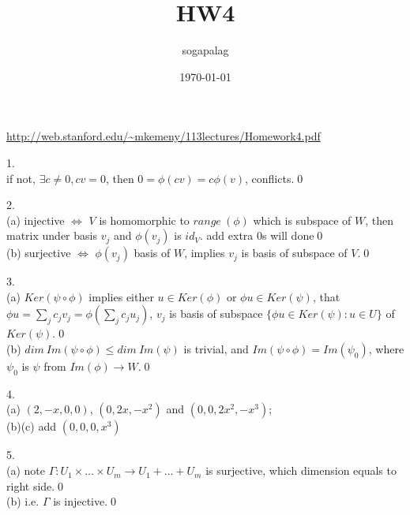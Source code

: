 \documentclass[paper=a4, fontsize=11pt]{scrartcl} %
\title{HW4}
\author{sogapalag}
\date{\normalsize\today}
\numberwithin{equation}{section} %
\numberwithin{figure}{section} %
\numberwithin{table}{section} %
\begin{document}
\maketitle 
\url{http://web.stanford.edu/~mkemeny/113lectures/Homework4.pdf}

1.\\
if not, $\exists c\neq 0, cv=0$, then $0 = \phi(cv) = c\phi(v)$, conflicts.\qed

2.\\
(a) injective $\Leftrightarrow$ $V$ is homomorphic to $range\ (\phi)$ which is subspace of $W$, then matrix under basis $v_j$ and $\phi(v_j)$ is $id_V$. add extra 0s will done\qed\\
(b) surjective $\Leftrightarrow$ $\phi(v_j)$ basis of $W$, implies $v_j$ is basis of subspace of $V$.\qed

3.\\
(a) $Ker(\psi\circ\phi)$ implies either $u\in Ker(\phi)$ or $\phi u \in Ker(\psi)$, that $\phi u = \sum_j c_jv_j = \phi(\sum_jc_j u_j)$, $v_j$ is basis of subspace $\{\phi u\in Ker(\psi): u\in U\}$ of $Ker(\psi)$.\qed\\
(b) $dim\ Im(\psi\circ\phi)\leq dim\ Im(\psi)$ is trivial, and $Im(\psi\circ\phi)=Im(\psi_0)$, where $\psi_0$ is $\psi$ from $Im(\phi)\rightarrow W$.\qed

4.\\
(a) $(2,-x,0,0)$, $(0,2x,-x^2)$ and $(0,0,2x^2,-x^3)$;\\
(b)(c) add $(0,0,0,x^3)$

5.\\
(a) note $\Gamma:U_1\times\dots\times U_m \rightarrow U_1+\dots+U_m$ is surjective, which dimension equals to right side.\qed\\
(b) i.e. $\Gamma$ is injective.\qed
\end{document}
